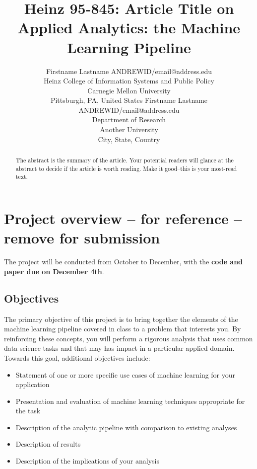 \documentclass[twoside,11pt]{article}
\begin{document}
\title{Heinz 95-845: Article Title on \\ Applied Analytics: the Machine Learning Pipeline}

\author{\name Firstname Lastname \email ANDREWID/email@address.edu \\
       \addr Heinz College of Information Systems and Public Policy\\
       Carnegie Mellon University\\
       Pittsburgh, PA, United States
       \AND
       \name Firstname Lastname \email ANDREWID/email@address.edu \\
       \addr Department of Research\\
       Another University \\
       City, State, Country} 

\maketitle

\begin{abstract}
  The abstract is the summary of the article. Your potential readers will glance at the abstract to decide
  if the article is worth reading. Make it good--this is your most-read text. 
\end{abstract}

\section{Project overview -- for reference -- remove for submission}

The project will be conducted from October to December, with the \textbf{code and paper due on December 4th}.

\subsection{Objectives}
The primary objective of this project is to bring together the elements of the machine learning pipeline covered in class to a problem that interests you. By reinforcing these concepts, you will perform a rigorous analysis that uses common data science tasks and that may has impact in a particular applied domain. Towards this goal, additional objectives include:
\begin{itemize} 
\item Statement of one or more specific use cases of machine learning for your application
\item Presentation and evaluation of machine learning techniques appropriate for the task
\item Description of the analytic pipeline with comparison to existing analyses
\item Description of results
\item Description of the implications of your analysis
\end{itemize}
\end{document}
